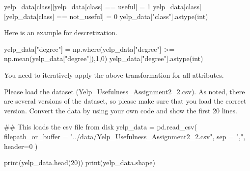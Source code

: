 \documentclass[
  letterpaper,
]{scrbook}
\newenvironment{Shaded}{\begin{snugshade}}{\end{snugshade}}
\newcommand{\BuiltInTok}[1]{\textcolor[rgb]{0.00,0.23,0.31}{#1}}
\newcommand{\CommentTok}[1]{\textcolor[rgb]{0.37,0.37,0.37}{#1}}
\newcommand{\DecValTok}[1]{\textcolor[rgb]{0.68,0.00,0.00}{#1}}
\newcommand{\NormalTok}[1]{\textcolor[rgb]{0.00,0.23,0.31}{#1}}
\newcommand{\OperatorTok}[1]{\textcolor[rgb]{0.37,0.37,0.37}{#1}}
\newcommand{\StringTok}[1]{\textcolor[rgb]{0.13,0.47,0.30}{#1}}
\begin{document}
\begin{Shaded}
\begin{Highlighting}[]
\NormalTok{yelp\_data[}\StringTok{\textquotesingle{}class\textquotesingle{}}\NormalTok{][yelp\_data[}\StringTok{\textquotesingle{}class\textquotesingle{}}\NormalTok{] }\OperatorTok{==} \StringTok{\textquotesingle{}useful\textquotesingle{}}\NormalTok{] }\OperatorTok{=} \DecValTok{1}
\NormalTok{yelp\_data[}\StringTok{\textquotesingle{}class\textquotesingle{}}\NormalTok{][yelp\_data[}\StringTok{\textquotesingle{}class\textquotesingle{}}\NormalTok{] }\OperatorTok{==} \StringTok{\textquotesingle{}not\_useful\textquotesingle{}}\NormalTok{] }\OperatorTok{=} \DecValTok{0}
\NormalTok{yelp\_data[}\StringTok{"class"}\NormalTok{].astype(}\StringTok{\textquotesingle{}int\textquotesingle{}}\NormalTok{)}
\end{Highlighting}
\end{Shaded}

Here is an example for descretization.

\begin{Shaded}
\begin{Highlighting}[]
\NormalTok{yelp\_data[}\StringTok{"degree"}\NormalTok{] }\OperatorTok{=}\NormalTok{ np.where(yelp\_data[}\StringTok{"degree"}\NormalTok{] }\OperatorTok{\textgreater{}=}\NormalTok{ np.mean(yelp\_data[}\StringTok{"degree"}\NormalTok{]),}\DecValTok{1}\NormalTok{,}\DecValTok{0}\NormalTok{)}
\NormalTok{yelp\_data[}\StringTok{"degree"}\NormalTok{].astype(}\StringTok{\textquotesingle{}int\textquotesingle{}}\NormalTok{)}
\end{Highlighting}
\end{Shaded}

You need to iteratively apply the above transformation for all
attributes.

Please load the dataset (Yelp\_Usefulness\_Assignment2\_2.csv). As
noted, there are several versions of the dataset, so please make sure
that you load the correct version. Convert the data by using your own
code and show the first 20 lines.

\begin{Shaded}
\begin{Highlighting}[]
\CommentTok{\#\# This loads the csv file from disk}
\NormalTok{yelp\_data }\OperatorTok{=}\NormalTok{ pd.read\_csv(}
\NormalTok{    filepath\_or\_buffer }\OperatorTok{=} \StringTok{"../data/Yelp\_Usefulness\_Assignment2\_2.csv"}\NormalTok{, sep }\OperatorTok{=} \StringTok{","}\NormalTok{, header}\OperatorTok{=}\DecValTok{0}\NormalTok{ )}

\BuiltInTok{print}\NormalTok{(yelp\_data.head(}\DecValTok{20}\NormalTok{))}
\BuiltInTok{print}\NormalTok{(yelp\_data.shape)}
\end{Highlighting}
\end{Shaded}
\end{document}

